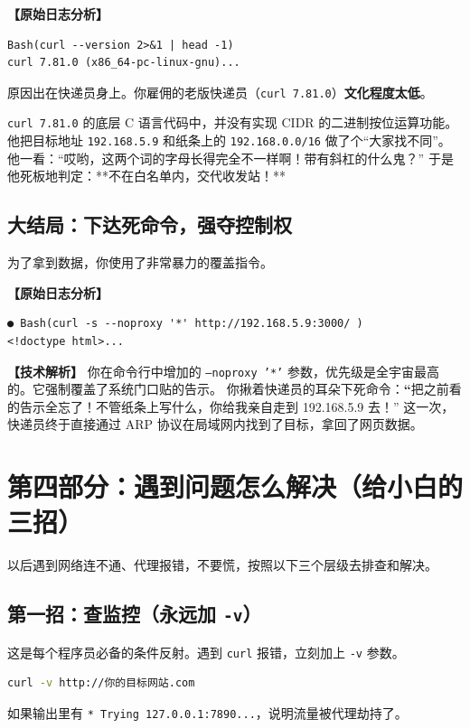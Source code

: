 \documentclass[12pt,a4paper]{ctexart}
\begin{document}
\textbf{【原始日志分析】}
\begin{lstlisting}[style=terminal]
Bash(curl --version 2>&1 | head -1)
curl 7.81.0 (x86_64-pc-linux-gnu)...
\end{lstlisting}

原因出在快递员身上。你雇佣的老版快递员（\texttt{curl 7.81.0}）\textbf{文化程度太低}。

\begin{tcolorbox}[colback=red!10,colframe=red!80!black,title=版本代沟造成的“弱智”行为,fonttitle=\bfseries,boxrule=0.5pt,arc=3mm]
\texttt{curl 7.81.0} 的底层 C 语言代码中，并没有实现 CIDR 的二进制按位运算功能。
他把目标地址 \texttt{192.168.5.9} 和纸条上的 \texttt{192.168.0.0/16} 做了个“大家找不同”。
他一看：“哎哟，这两个词的字母长得完全不一样啊！带有斜杠的什么鬼？”
于是他死板地判定：**不在白名单内，交代收发站！**
\end{tcolorbox}

\newpage
\subsection{大结局：下达死命令，强夺控制权}
为了拿到数据，你使用了非常暴力的覆盖指令。

\textbf{【原始日志分析】}
\begin{lstlisting}[style=terminal]
● Bash(curl -s --noproxy '*' http://192.168.5.9:3000/ )
<!doctype html>...
\end{lstlisting}

\textbf{【技术解析】}
你在命令行中增加的 \texttt{--noproxy '*'} 参数，优先级是全宇宙最高的。它强制覆盖了系统门口贴的告示。
你揪着快递员的耳朵下死命令：\textbf“把之前看的告示全忘了！不管纸条上写什么，你给我亲自走到 192.168.5.9 去！”
这一次，快递员终于直接通过 ARP 协议在局域网内找到了目标，拿回了网页数据。

\section{第四部分：遇到问题怎么解决（给小白的三招）}

以后遇到网络连不通、代理报错，不要慌，按照以下三个层级去排查和解决。

\subsection{第一招：查监控（永远加 \texttt{-v}）}
这是每个程序员必备的条件反射。遇到 \texttt{curl} 报错，立刻加上 \texttt{-v} 参数。
\begin{lstlisting}[language=bash]
curl -v http://你的目标网站.com
\end{lstlisting}
如果输出里有 \texttt{* Trying 127.0.0.1:7890...}，说明流量被代理劫持了。
\end{document}
